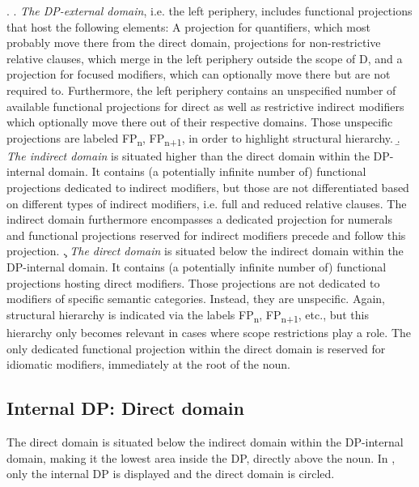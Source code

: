 \ex. \a. \textit{The DP-external domain}, i.e. the left periphery, includes functional projections that host the following elements: A projection for quantifiers, which most probably move there from the direct domain, projections for non-restrictive relative clauses, which merge in the left periphery outside the scope of D, and a projection for focused modifiers, which can optionally move there but are not required to. Furthermore, the left periphery contains an unspecified number of available functional projections for direct as well as restrictive indirect modifiers which optionally move there out of their respective domains. Those unspecific projections are labeled FP\textsubscript{n}, FP\textsubscript{n+1}, in order to highlight structural hierarchy.
\b. \textit{The indirect domain} is situated higher than the direct domain within the DP-internal domain. It contains (a potentially infinite number of) functional projections dedicated to indirect modifiers, but those are not differentiated based on different types of indirect modifiers, i.e. full and reduced relative clauses. The indirect domain furthermore encompasses a dedicated projection for numerals and functional projections reserved for indirect modifiers precede and follow this projection.
\c. \textit{The direct domain} is situated below the indirect domain within the DP-internal domain. It contains (a potentially infinite number of) functional projections hosting direct modifiers. Those projections are not dedicated to modifiers of specific semantic categories. Instead, they are unspecific. Again, structural hierarchy is indicated via the labels FP\textsubscript{n}, FP\textsubscript{n+1}, etc., but this hierarchy only becomes relevant in cases where scope restrictions play a role. The only dedicated functional projection within the direct domain is reserved for idiomatic modifiers, immediately at the root of the noun.

\subsection{Internal DP: Direct domain} \label{internaldirect}

The direct domain is situated below the indirect domain within the DP-internal domain, making it the lowest area inside the DP, directly above the noun. In , only the internal DP is displayed and the direct domain is circled.

